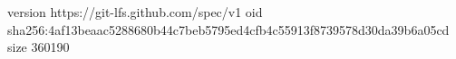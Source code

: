 version https://git-lfs.github.com/spec/v1
oid sha256:4af13beaac5288680b44c7beb5795ed4cfb4c55913f8739578d30da39b6a05cd
size 360190
